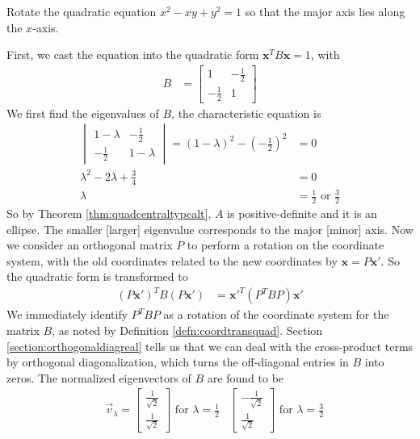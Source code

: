 \begin{exmp}
Rotate the quadratic equation $x^2 - xy + y^2 = 1$ so that the major axis lies along the $x$-axis.
\label{exmp:quadgraphrotate}
\end{exmp}
First, we cast the equation into the quadratic form $\textbf{x}^T B\textbf{x} = 1$, with
\begin{align*}
B &=
\begin{bmatrix}
1 & -\frac{1}{2} \\
-\frac{1}{2} & 1
\end{bmatrix}
\end{align*}
We first find the eigenvalues of $B$, the characteristic equation is
\begin{align*}
\begin{vmatrix}
1-\lambda & -\frac{1}{2} \\
-\frac{1}{2} & 1-\lambda
\end{vmatrix} = (1-\lambda)^2 - (-\frac{1}{2})^2 &= 0 \\
\lambda^2 - 2\lambda + \frac{3}{4} &= 0 \\
\lambda &= \frac{1}{2} \text{ or } \frac{3}{2}
\end{align*}
So by Theorem \ref{thm:quadcentraltypealt}, $A$ is positive-definite and it is an ellipse. The smaller [larger] eigenvalue corresponds to the major [minor] axis. Now we consider an orthogonal matrix $P$ to perform a rotation on the coordinate system, with the old coordinates related to the new coordinates by $\textbf{x} = P\textbf{x}'$. So the quadratic form is transformed to
\begin{align*}
(P\textbf{x}')^T B (P\textbf{x}') &= \textbf{x}'^T (P^T BP) \textbf{x}'
\end{align*}
We immediately identify $P^T BP$ as a rotation of the coordinate system for the matrix $B$, as noted by Definition \ref{defn:coordtransquad}. Section \ref{section:orthogonaldiagreal} tells us that we can deal with the cross-product terms by orthogonal diagonalization, which turns the off-diagonal entries in $B$ into zeros. The normalized eigenvectors of $B$ are found to be
\begin{align*}
&\vec{v}_\lambda = \begin{bmatrix}
\frac{1}{\sqrt{2}} \\
\frac{1}{\sqrt{2}}
\end{bmatrix}
\text{ for } \lambda = \frac{1}{2}
& \begin{bmatrix}
-\frac{1}{\sqrt{2}} \\
\frac{1}{\sqrt{2}}
\end{bmatrix}
\text{ for } \lambda = \frac{3}{2}
\end{align*}
